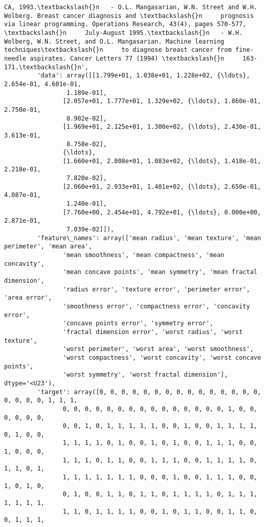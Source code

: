 \documentclass[11pt]{article}
\begin{document}
\begin{Verbatim}[commandchars=\\\{\}]
CA, 1993.\textbackslash{}n   - O.L. Mangasarian, W.N. Street and W.H. Wolberg. Breast cancer diagnosis and \textbackslash{}n     prognosis via linear programming. Operations Research, 43(4), pages 570-577, \textbackslash{}n     July-August 1995.\textbackslash{}n   - W.H. Wolberg, W.N. Street, and O.L. Mangasarian. Machine learning techniques\textbackslash{}n     to diagnose breast cancer from fine-needle aspirates. Cancer Letters 77 (1994) \textbackslash{}n     163-171.\textbackslash{}n',
         'data': array([[1.799e+01, 1.038e+01, 1.228e+02, {\ldots}, 2.654e-01, 4.601e-01,
                 1.189e-01],
                [2.057e+01, 1.777e+01, 1.329e+02, {\ldots}, 1.860e-01, 2.750e-01,
                 8.902e-02],
                [1.969e+01, 2.125e+01, 1.300e+02, {\ldots}, 2.430e-01, 3.613e-01,
                 8.758e-02],
                {\ldots},
                [1.660e+01, 2.808e+01, 1.083e+02, {\ldots}, 1.418e-01, 2.218e-01,
                 7.820e-02],
                [2.060e+01, 2.933e+01, 1.401e+02, {\ldots}, 2.650e-01, 4.087e-01,
                 1.240e-01],
                [7.760e+00, 2.454e+01, 4.792e+01, {\ldots}, 0.000e+00, 2.871e-01,
                 7.039e-02]]),
         'feature\_names': array(['mean radius', 'mean texture', 'mean perimeter', 'mean area',
                'mean smoothness', 'mean compactness', 'mean concavity',
                'mean concave points', 'mean symmetry', 'mean fractal dimension',
                'radius error', 'texture error', 'perimeter error', 'area error',
                'smoothness error', 'compactness error', 'concavity error',
                'concave points error', 'symmetry error',
                'fractal dimension error', 'worst radius', 'worst texture',
                'worst perimeter', 'worst area', 'worst smoothness',
                'worst compactness', 'worst concavity', 'worst concave points',
                'worst symmetry', 'worst fractal dimension'], dtype='<U23'),
         'target': array([0, 0, 0, 0, 0, 0, 0, 0, 0, 0, 0, 0, 0, 0, 0, 0, 0, 0, 0, 1, 1, 1,
                0, 0, 0, 0, 0, 0, 0, 0, 0, 0, 0, 0, 0, 0, 0, 1, 0, 0, 0, 0, 0, 0,
                0, 0, 1, 0, 1, 1, 1, 1, 1, 0, 0, 1, 0, 0, 1, 1, 1, 1, 0, 1, 0, 0,
                1, 1, 1, 1, 0, 1, 0, 0, 1, 0, 1, 0, 0, 1, 1, 1, 0, 0, 1, 0, 0, 0,
                1, 1, 1, 0, 1, 1, 0, 0, 1, 1, 1, 0, 0, 1, 1, 1, 1, 0, 1, 1, 0, 1,
                1, 1, 1, 1, 1, 1, 1, 0, 0, 0, 1, 0, 0, 1, 1, 1, 0, 0, 1, 0, 1, 0,
                0, 1, 0, 0, 1, 1, 0, 1, 1, 0, 1, 1, 1, 1, 0, 1, 1, 1, 1, 1, 1, 1,
                1, 1, 0, 1, 1, 1, 1, 0, 0, 1, 0, 1, 1, 0, 0, 1, 1, 0, 0, 1, 1, 1,

\end{Verbatim}
\end{document}
